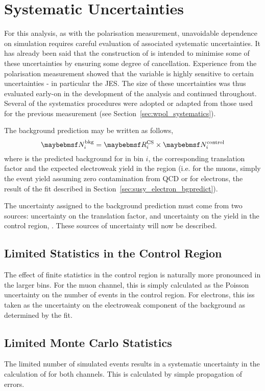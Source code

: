 \section{Systematic Uncertainties}
\label{sec:susy_systematics}
For this analysis, as with the \PW polarisation measurement, unavoidable
dependence on simulation requires careful evaluation of associated systematic
uncertainties. It has already been said that the construction of \RCS is
intended to minimise some of these uncertainties by ensuring some degree of
cancellation. Experience from the \PW polarisation measurement showed that the
\LP variable is highly sensitive to certain uncertainties - in particular the
\ac{JES}. The size of these uncertainties was thus evaluated early-on in the
development of the analysis and continued throughout. Several of the systematics
procedures were adopted or adapted from those used for the previous measurement
(see Section~\ref{sec:wpol_systematics}).

The background prediction may be written as follows,
\begin{equation}
\NBkgi = \RCSi \times \NControli
\end{equation}
where \NBkgi is the predicted background for \LPsignal in \STlep bin $i$, \RCSi
the corresponding translation factor and \NControli the expected electroweak
yield in the region \LPcontrol (i.e. for the muons, simply the event yield
assuming zero contamination from \ac{QCD} or for electrons, the result of the
fit described in Section~\ref{sec:susy_electron_bgpredict}).

The uncertainty assigned to the background prediction \NBkg must come from two
sources: uncertainty on the translation factor, \RCS and uncertainty on the yield
in the control region, \NControl. These sources of uncertainty will now be
described.

\subsection{Limited Statistics in the Control Region \texorpdfstring{\LPcontrol}{\LPcontrolBM}}
The effect of finite statistics in the control region is naturally more
pronounced in the larger \STlep bins. For the muon channel, this is simply
calculated as the Poisson uncertainty on the number of events in the control
region. For electrons, this iss taken as the uncertainty on the electroweak
component of the background as determined by the fit.

\subsection{Limited Monte Carlo Statistics}
\label{sec:susy_syst_mcstats}
The limited number of simulated events results in a systematic uncertainty in
the calculation of \RCS for both channels. This is calculated by simple
propagation of errors.

